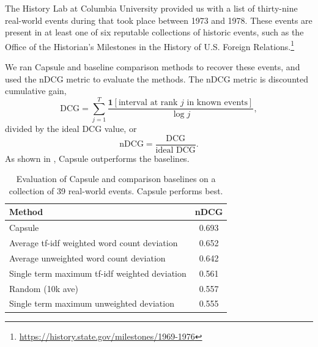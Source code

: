 The History Lab at Columbia University provided us with a list of
thirty-nine real-world events during that took place between 1973 and
1978. These events are present in at least one of six reputable
collections of historic events, such as the Office of the Historian's
Milestones in the History of U.S. Foreign
Relations.\footnote{\url{https://history.state.gov/milestones/1969-1976}}

We ran Capsule and baseline comparison methods to recover these events, and used the nDCG metric to evaluate the methods.  The nDCG metric is discounted cumulative gain,
\begin{equation}
\mbox{DCG} = \sum_{j=1}^T \frac{\mathbf{1}[\mbox{interval at rank $j$ in known events}]}{\log j},
\end{equation}
divided by the ideal DCG value, or
\begin{equation}
\mbox{nDCG} = \frac{\mbox{DCG}}{\mbox{ideal DCG}}.
\end{equation}
As shown in , Capsule outperforms the baselines.
\begin{table}[bt]
\centering
\begin{tabular}{l c}
\toprule
\textbf{Method} & \textbf{nDCG} \\
\midrule
Capsule & 0.693 \\
Average tf-idf weighted word count deviation & 0.652 \\
Average unweighted word count deviation & 0.642 \\
Single term maximum tf-idf weighted deviation & 0.561 \\
Random (10k ave) & 0.557 \\
Single term maximum unweighted deviation & 0.555 \\
\bottomrule
\end{tabular}
\caption{Evaluation of Capsule and comparison baselines on a collection of 39 real-world events.  Capsule performs best.}
\label{table:cables:ndcg}
\end{table}


